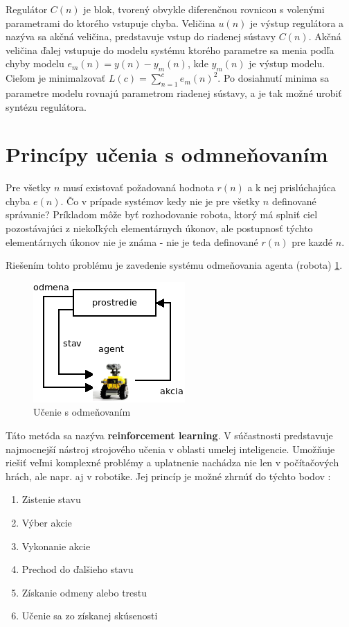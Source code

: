 Regulátor $C(n)$ je blok, tvorený obvykle diferenčnou rovnicou s volenými
parametrami do ktorého vstupuje chyba.
Veličina $u(n)$ je výstup regulátora a nazýva sa akčná veličina, predstavuje
vstup do riadenej sústavy $C(n)$. Akčná veličina ďalej vstupuje do modelu systému
ktorého parametre sa menia podľa chyby modelu $e_m(n) = y(n) - y_m(n)$, kde $y_m(n)$
je výstup modelu. Cieľom je minimalzovať $L(c) = \sum\limits_{n=1}^{c}{{e_m}(n)^2}$.
Po dosiahnutí minima sa parametre modelu rovnajú parametrom riadenej sústavy,
a je tak možné urobiť syntézu regulátora.


\section{Princípy učenia s odmneňovaním}

Pre všetky $n$ musí existovať požadovaná hodnota $r(n)$ a k nej prislúchajúca
chyba $e(n)$. Čo v prípade systémov kedy nie je pre všetky $n$ definované správanie?
Príkladom môže byť rozhodovanie robota, ktorý má splniť ciel pozostávajúci z
niekoľkých elementárnych úkonov, ale postupnosť týchto elementárnych úkonov nie je známa -
nie je teda definované $r(n)$ pre kazdé $n$.

Riešením tohto problému je zavedenie systému odmeňovania agenta (robota) \ref{img:reinforcement_learning}.

\begin{figure}[!htb]
\center
\includegraphics[scale=.8]{../diagrams/agent.png}
\caption{Učenie s odmeňovaním}
\label{img:reinforcement_learning}
\end{figure}

Táto metóda sa nazýva  {\bf reinforcement learning}. V súčastnosti predstavuje
najmocnejší nástroj strojového učenia v oblasti umelej inteligencie. Umožňuje
riešiť veľmi komplexné problémy a uplatnenie nachádza nie len v počítačových
hrách, ale napr. aj v robotike.
Jej princíp je možné zhrnúť do týchto bodov :

\begin{enumerate}
  \item Zistenie stavu
  \item Výber akcie
  \item Vykonanie akcie
  \item Prechod do ďalšieho stavu
  \item Získanie odmeny alebo trestu
  \item Učenie sa zo získanej skúsenosti
\end{enumerate}

